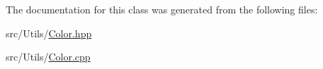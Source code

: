 The documentation for this class was generated from the following files\+:\begin{DoxyCompactItemize}
\item 
src/\+Utils/\hyperlink{_color_8hpp}{Color.\+hpp}\item 
src/\+Utils/\hyperlink{_color_8cpp}{Color.\+cpp}\end{DoxyCompactItemize}
